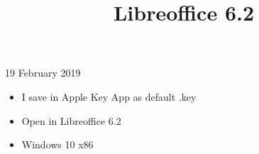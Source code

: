 \documentclass[11pt,a4paper]{article}
\title{Libreoffice 6.2}
\begin{document}
\maketitle

19 February 2019

\begin{itemize}
\item I save in Apple Key App as default .key
\item Open in Libreoffice 6.2
\item Windows 10 x86
\end{itemize}
\end{document}
